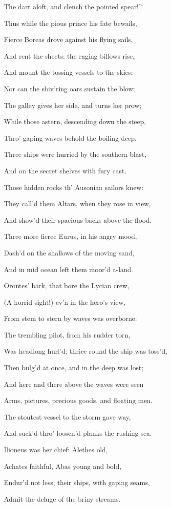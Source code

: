 The dart aloft, and clench the pointed spear!”

Thus while the pious prince his fate bewails,

Fierce Boreas drove against his flying sails,

And rent the sheets; the raging billows rise,

And mount the tossing vessels to the skies:

Nor can the shiv’ring oars sustain the blow;

The galley gives her side, and turns her prow;

While those astern, descending down the steep,

Thro’ gaping waves behold the boiling deep.

Three ships were hurried by the southern blast,

And on the secret shelves with fury cast.

Those hidden rocks th’ Ausonian sailors knew:

They call’d them Altars, when they rose in view,

And show’d their spacious backs above the flood.

Three more fierce Eurus, in his angry mood,

Dash’d on the shallows of the moving sand,

And in mid ocean left them moor’d a-land.

Orontes’ bark, that bore the Lycian crew,

(A horrid sight!) ev’n in the hero’s view,

From stem to stern by waves was overborne:

The trembling pilot, from his rudder torn,

Was headlong hurl’d; thrice round the ship was toss’d,

Then bulg’d at once, and in the deep was lost;

And here and there above the waves were seen

Arms, pictures, precious goods, and floating men.

The stoutest vessel to the storm gave way,

And suck’d thro’ loosen’d planks the rushing sea.

Ilioneus was her chief: Alethes old,

Achates faithful, Abas young and bold,

Endur’d not less; their ships, with gaping seams,

Admit the deluge of the briny streams.

